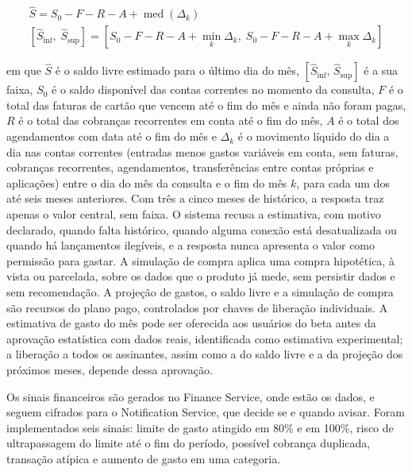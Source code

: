 \begin{equation}
\begin{gathered}
\hat{S} = S_0 - F - R - A + \operatorname{med}\left(\Delta_k\right) \\
\left[\hat{S}_{\mathrm{inf}},\; \hat{S}_{\mathrm{sup}}\right] = \left[S_0 - F - R - A + \min_k \Delta_k,\; S_0 - F - R - A + \max_k \Delta_k\right]
\end{gathered}
\label{eq:saldolivre}
\end{equation}

\noindent em que $\hat{S}$ é o saldo livre estimado para o último dia do mês, $\left[\hat{S}_{\mathrm{inf}},\, \hat{S}_{\mathrm{sup}}\right]$ é a sua faixa, $S_0$ é o saldo disponível das contas correntes no momento da consulta, $F$ é o total das faturas de cartão que vencem até o fim do mês e ainda não foram pagas, $R$ é o total das cobranças recorrentes em conta até o fim do mês, $A$ é o total dos agendamentos com data até o fim do mês e $\Delta_k$ é o movimento líquido do dia a dia nas contas correntes (entradas menos gastos variáveis em conta, sem faturas, cobranças recorrentes, agendamentos, transferências entre contas próprias e aplicações) entre o dia do mês da consulta e o fim do mês $k$, para cada um dos até seis meses anteriores. Com três a cinco meses de histórico, a resposta traz apenas o valor central, sem faixa. O sistema recusa a estimativa, com motivo declarado, quando falta histórico, quando alguma conexão está desatualizada ou quando há lançamentos ilegíveis, e a resposta nunca apresenta o valor como permissão para gastar. A simulação de compra aplica uma compra hipotética, à vista ou parcelada, sobre os dados que o produto já mede, sem persistir dados e sem recomendação. A projeção de gastos, o saldo livre e a simulação de compra são recursos do plano pago, controlados por chaves de liberação individuais. A estimativa de gasto do mês pode ser oferecida aos usuários do beta antes da aprovação estatística com dados reais, identificada como estimativa experimental; a liberação a todos os assinantes, assim como a do saldo livre e a da projeção dos próximos meses, depende dessa aprovação.

Os sinais financeiros são gerados no Finance Service, onde estão os dados, e seguem cifrados para o Notification Service, que decide se e quando avisar. Foram implementados seis sinais: limite de gasto atingido em 80\% e em 100\%, risco de ultrapassagem do limite até o fim do período, possível cobrança duplicada, transação atípica e aumento de gasto em uma categoria.

